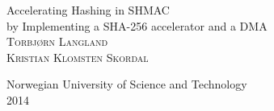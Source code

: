 \documentclass[a4paper]{report}
\begin{document}
\begin{titlepage}
	\begin{center}
		{\huge Accelerating Hashing in SHMAC}\\[0.5cm]
		{\large by Implementing a SHA-256 accelerator and a DMA}\\[3.5cm]

		\textsc{Torbjørn Langland}\\
		\textsc{Kristian Klomsten Skordal}

		\vfill
		{\large Norwegian University of Science and Technology}\\[0.2em]
		{2014}
	\end{center}
\end{titlepage}



\tableofcontents


%







\end{document}
